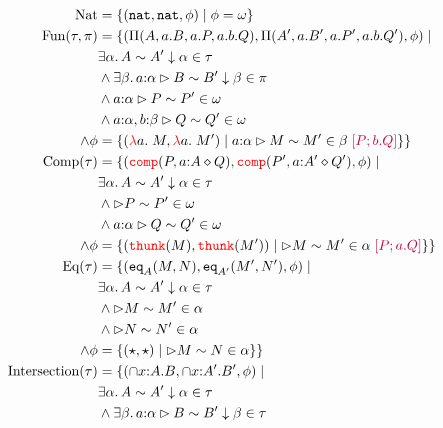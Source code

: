 \begin{align*}
  \text{Nat} &= \{(\nat,\nat,\phi) \mid \phi = \omega\}\\
  \iffalse
  \text{Pot}(\tau,\pi) &= 
    \{(\relpotty{A}{a}{B}, \relpotty{A'}{a}{B'}, \phi) \mid &\\
    &\exists \alpha.\, \sameType{A}{A'}{\alpha}{\tau} \\
    &\land\exists \beta.\, \sameTypeOne{a}{\alpha}{B}{B'}{\beta}{\pi} \\
    &\land \phi = \kappa(\alpha,a.\beta)
    \}\\
    \fi
  \text{Fun}(\tau, \pi) &=
  \{(\arrabt{A}{a.B}{a.P,a.b.Q}, \arrabt{A'}{a.B'}{a.P', a.b.Q'}, \phi) 
  \mid & \\
  &\exists \alpha.\, \sameType{A}{A'}{\alpha}{\tau} \\
  &\land\exists \beta.\, \sameTypeOne{a}{\alpha}{B}{B'}{\beta}{\pi} \\
  &\land\sameComp{\isOf{a}{\alpha}}{P}{P'}{\omega} \\
  &\land\sameComp{\isOf{a}{\alpha},\isOf{b}{\beta}}{Q}{Q'}{\omega} \\
  \land\phi &= \{(\lam{a}{\_}{M}, \lam{a}{}{M'}) \mid
  \sameCComp{\isOf{a}{\alpha}}{M}{M'}{\beta}{P}{b.Q}
   \}
  \}\\
  \text{Comp}(\tau) &= \{
  (\ccomp{P}{\isOf{a}{A}}{Q}, \ccomp{P'}{\isOf{a}{A'}}{Q'}, \phi) \mid \\
  &\exists \alpha.\, \sameType{A}{A'}{\alpha}{\tau}\\
  &\land \sameComp{}{P}{P'}{\omega}\\ 
  &\land \sameComp{\isOf{a}{\alpha}}{Q}{Q'}{\omega}\\
  \land\phi &= \{(\thunk{M}, \thunk{M'}) \mid \sameCComp{}{M}{M'}{\alpha}{P}{a.Q} \}
  \}\\
  \text{Eq}(\tau) &= \{
    (\eqty{A}{M}{N}, \eqty{A'}{M'}{N'}, \phi) \mid \\
  &\exists \alpha.\, \sameType{A}{A'}{\alpha}{\tau}\\
  &\land\sameComp{}{M}{M'}{\alpha}\\
  &\land\sameComp{}{N}{N'}{\alpha}\\
  \land\phi &= \{(\triv, \triv) \mid \sameComp{}{M}{N}{\alpha}
  \}
  \}\\
  \text{Intersection}(\tau) &= \{
    (\intty{\isOf{x}{A}}{B}, \intty{\isOf{x}{A'}}{B'},\phi) \mid \\
    &\exists \alpha.\, \sameType{A}{A'}{\alpha}{\tau} \\
    &\land\exists \beta.\, \sameTypeOne{a}{\alpha}{B}{B'}{\beta}{\tau} \\

\end{align*}
